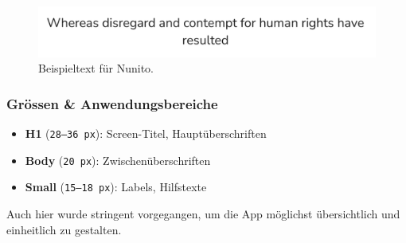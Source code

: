 \begin{figure}[h!]
	\centering
	\includegraphics[width=0.7\linewidth]{images/Font}
	\caption{Beispieltext für Nunito.}
	\label{fig:font}
\end{figure}


\subsubsection{Grössen \& Anwendungsbereiche}
\begin{itemize}
	\item \textbf{H1} (\texttt{28--36\,px}): Screen-Titel, Hauptüberschriften
	\item \textbf{Body} (\texttt{20\,px}): Zwischenüberschriften
	\item \textbf{Small} (\texttt{15--18\,px}): Labels, Hilfstexte
\end{itemize}
Auch hier wurde stringent vorgegangen, um die App möglichst übersichtlich und einheitlich zu gestalten.

\newpage
